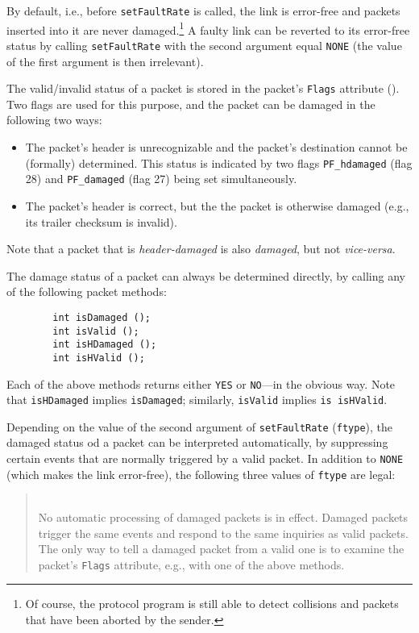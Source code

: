By default, i.e., before {\tt setFaultRate} is called, the link is error-free
and packets inserted into it are never
damaged.\footnote{Of course, the protocol program is still able to detect
collisions and packets that have been aborted by the sender.}
A faulty link can be reverted to its error-free status by calling
{\tt setFaultRate} with the second argument equal {\tt NONE} (the value of
the first argument is then irrelevant).

The valid/invalid status of a packet is stored in the packet's
{\tt Flags} attribute ().
Two flags are used for this purpose, and the packet can be damaged in the
following two ways:
\begin{itemize}
\item
The packet's header is unrecognizable and the packet's destination cannot
be (formally) determined.
This status is indicated by two flags {\tt PF\_hdamaged} (flag 28) and
{\tt PF\_damaged} (flag 27) being set simultaneously.
\item
The packet's header is correct, but the the packet is otherwise damaged
(e.g., its trailer checksum is invalid).
\end{itemize}
Note that a packet that is {\em header-damaged\/} is also {\em damaged}, but
not {\em vice-versa}.

The damage status of a packet can always be determined directly, by calling
any of the following packet methods:
\begin{verbatim}
        int isDamaged ();
        int isValid ();
        int isHDamaged ();
        int isHValid ();
\end{verbatim}
Each of the above methods returns either {\tt YES} or {\tt NO}---in the
obvious way.
Note that {\tt isHDamaged} implies {\tt isDamaged}; similarly, {\tt isValid}
implies {\tt is isHValid}.

Depending on the value of the second argument of {\tt setFaultRate}
({\tt ftype}),
the damaged status od a packet can be interpreted automatically, by
suppressing certain events that are normally triggered by a valid packet.
In addition to {\tt NONE} (which makes the link error-free), the following
three values of {\tt ftype} are legal:

\medskip

\begin{quote}
\noindent{}\\ \hspace{0in}
No automatic processing of damaged packets is in effect.
Damaged packets trigger the same events and respond to the same inquiries
as valid packets.
The only way to tell a damaged packet from a valid one is to examine the
packet's {\tt Flags} attribute, e.g., with one of the above methods.
\end{quote}

